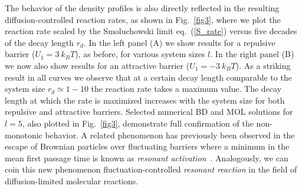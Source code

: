 \documentclass[preprint,superscriptaddress]{revtex4-1}
\begin{document}
The behavior of the density profiles is also directly reflected in the resulting diffusion-controlled reaction rates, as shown in Fig.~\ref{fig3},
where we plot the reaction rate scaled by the Smoluchowski limit eq.~(\ref{S_rate}) versus five decades of the decay length $r_d$.  In the left panel (A) we show results for a repulsive barrier ($U_1 = 3 ~k_B T$), as before, for various system sizes $l$.  In the right  panel  (B) we now also show results for an attractive barrier ($U_1 = -3 ~k_B T$).   
As a striking result in all curves we observe that at a certain decay length comparable to the system size $r_d \simeq 1 - 10$ 
 the reaction rate takes a maximum value. The decay length at which the rate is maximized increases with the system size for both
 repulsive and attractive barriers. Selected numerical BD and MOL solutions for $l=5$, also plotted in  Fig.~\ref{fig3}, demonstrate 
 full confirmation of the non-monotonic behavior.  
 A related phenomenon has previously been observed in the escape of Brownian particles over fluctuating barriers where a minimum in the 
 mean first passage time is known as \emph{resonant activation}~\cite{Doering1992, Zurcher1993, Pechukas1994, Reimann1995, Reimann1995a}. Analogously, we can coin this new phenomenon fluctuation-controlled {\it resonant reaction} in the 
 field of diffusion-limited molecular reactions.
\end{document}
